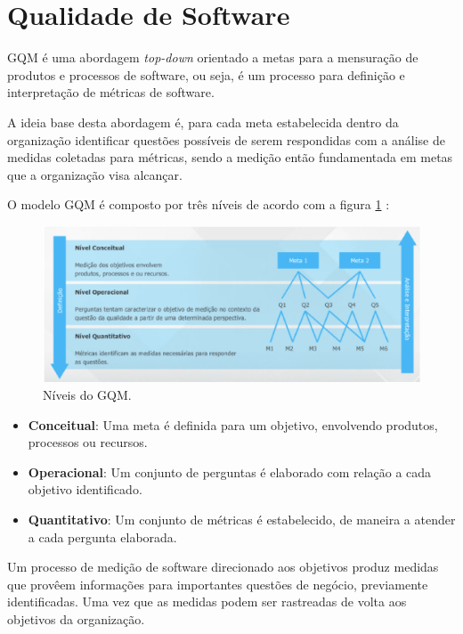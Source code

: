 \section{Qualidade de Software}

GQM é uma abordagem \textit{top-down} orientado a metas para a mensuração de produtos e processos de software, ou seja, é um processo para definição e interpretação de métricas de software. \cite{junior}

A ideia base desta abordagem é, para cada meta estabelecida dentro da organização identificar questões possíveis de serem respondidas com a análise de medidas coletadas para métricas, sendo a medição então fundamentada em metas que a organização visa alcançar.

O modelo GQM é composto por três níveis de acordo com a figura \ref{fig:gqm} \cite{junior}:

\begin{figure}[h!]
	\centering
  \includegraphics[keepaspectratio=true,scale=0.5]{figuras/gqm.eps}
  \caption{Níveis do GQM.}
	\label{fig:gqm}
\end{figure}

\begin{itemize}
  \item \textbf{Conceitual}: Uma meta é definida para um objetivo, envolvendo produtos, processos ou recursos.
  \item \textbf{Operacional}: Um conjunto de perguntas é elaborado com relação a cada objetivo identificado.
  \item \textbf{Quantitativo}: Um conjunto de métricas é estabelecido, de maneira a atender a cada pergunta elaborada.
\end{itemize}

Um processo de medição de software direcionado aos objetivos produz medidas que provêem informações para importantes questões de negócio, previamente identificadas. Uma vez que as medidas podem ser rastreadas de volta aos objetivos da organização.
